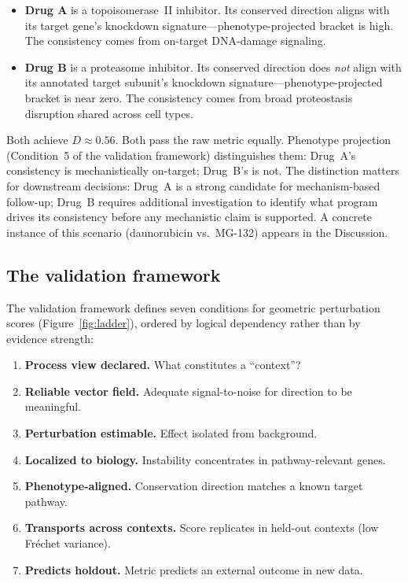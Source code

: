 \documentclass[11pt]{article}
\begin{document}
\begin{itemize}
  \item \textbf{Drug A} is a topoisomerase~II inhibitor. Its conserved
    direction aligns with its target gene's knockdown
    signature---phenotype-projected bracket is high. The consistency comes
    from on-target DNA-damage signaling.
  \item \textbf{Drug B} is a proteasome inhibitor. Its conserved direction
    does \emph{not} align with its annotated target subunit's knockdown
    signature---phenotype-projected bracket is near zero. The consistency
    comes from broad proteostasis disruption shared across cell types.
\end{itemize}

Both achieve $D \approx 0.56$. Both pass the raw metric equally. Phenotype
projection (Condition~5 of the validation framework) distinguishes them: Drug~A's
consistency is mechanistically on-target; Drug~B's is not. The distinction
matters for downstream decisions: Drug~A is a strong candidate for
mechanism-based follow-up; Drug~B requires additional investigation to
identify what program drives its consistency before any mechanistic claim
is supported. A concrete instance of this scenario (daunorubicin vs.\
MG-132) appears in the Discussion.

\subsection{The validation framework}

The validation framework defines seven conditions for geometric
perturbation scores (Figure~\ref{fig:ladder}), ordered by logical
dependency rather than by evidence strength:

\begin{enumerate}
  \item \textbf{Process view declared.} What constitutes a ``context''?
  \item \textbf{Reliable vector field.} Adequate signal-to-noise for
    direction to be meaningful.
  \item \textbf{Perturbation estimable.} Effect isolated from background.
  \item \textbf{Localized to biology.} Instability concentrates in
    pathway-relevant genes.
  \item \textbf{Phenotype-aligned.} Conservation direction matches a
    known target pathway.
  \item \textbf{Transports across contexts.} Score replicates in held-out
    contexts (low Fr\'echet variance).
  \item \textbf{Predicts holdout.} Metric predicts an external outcome
    in new data.
\end{enumerate}
\end{document}

